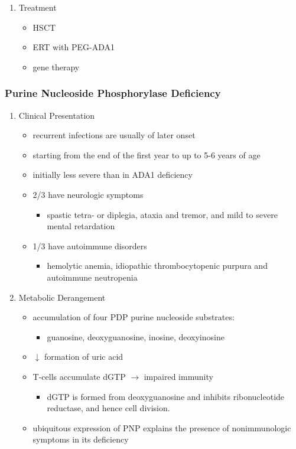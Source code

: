 \documentclass[12pt]{scrartcl}
\begin{document}
\begin{enumerate}
\item Treatment
\label{sec:org027beed}
\begin{itemize}
\item HSCT
\item ERT with PEG-ADA1
\item gene therapy
\end{itemize}
\end{enumerate}

\subsubsection{Purine Nucleoside Phosphorylase Deficiency}
\label{sec:org7e94636}
\begin{enumerate}
\item Clinical Presentation
\label{sec:orgfad6d85}
\begin{itemize}
\item recurrent infections are usually of later onset
\item starting from the end of the first year to up to 5-6 years of age
\item initially less severe than in ADA1 deficiency
\item 2/3 have neurologic symptoms
\begin{itemize}
\item spastic tetra- or diplegia, ataxia and tremor, and mild to severe
mental retardation
\end{itemize}
\item 1/3 have autoimmune disorders
\begin{itemize}
\item hemolytic anemia, idiopathic thrombocytopenic purpura and
autoimmune neutropenia
\end{itemize}
\end{itemize}

\item Metabolic Derangement
\label{sec:org9abd716}
\begin{itemize}
\item accumulation of four PDP purine nucleoside substrates:
\begin{itemize}
\item guanosine, deoxyguanosine, inosine, deoxyinosine
\end{itemize}
\end{itemize}
\begin{itemize}
\item \(\downarrow\) formation of uric acid
\item T-cells accumulate dGTP \(\to\) impaired immunity
\begin{itemize}
\item dGTP is formed from deoxyguanosine and inhibits ribonucleotide
reductase, and hence cell division.
\end{itemize}
\item ubiquitous expression of PNP explains the presence of nonimmunologic
symptoms in its deficiency
\end{itemize}


\end{enumerate}
\end{document}
